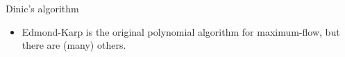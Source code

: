 \documentclass{beamer}
\begin{document}
	\begin{frame}[plain]{Dinic's algorithm}
		\begin{itemize}
			\item Edmond-Karp is the original polynomial algorithm for maximum-flow, but there are (many) others.
		\end{itemize}
\end{frame}
\end{document}
